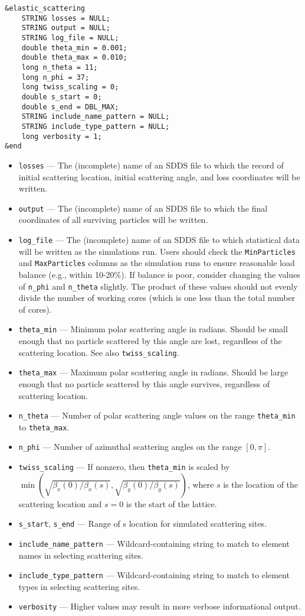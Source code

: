 \documentclass[11pt]{article}
\begin{document}
\begin{verbatim}
&elastic_scattering
    STRING losses = NULL;
    STRING output = NULL;
    STRING log_file = NULL;
    double theta_min = 0.001;
    double theta_max = 0.010;
    long n_theta = 11;
    long n_phi = 37;
    long twiss_scaling = 0;
    double s_start = 0;
    double s_end = DBL_MAX;
    STRING include_name_pattern = NULL;
    STRING include_type_pattern = NULL;
    long verbosity = 1;        
&end
\end{verbatim}

\begin{itemize}
\item \verb|losses| --- The (incomplete) name of an SDDS file to which the record of initial scattering location,
  initial scattering angle, and loss coordinates will be written.
\item \verb|output| --- The (incomplete) name of an SDDS file to which the final coordinates of all surviving particles
  will be written.
\item \verb|log_file| --- The (incomplete) name of an SDDS file to which statistical data will be written as the simulations
  run. Users should check the \verb|MinParticles| and \verb|MaxParticles| columns as the simulation runs to ensure
  reasonable load balance (e.g., within 10-20\%). If balance is poor, consider changing the values of \verb|n_phi| and
  \verb|n_theta| slightly. The product of these values should not evenly divide the number of working cores (which is
  one less than the total number of cores).
\item \verb|theta_min| --- Minimum polar scattering angle in radians. Should be small enough that no particle scattered
  by this angle are lost, regardless of the scattering location. See also \verb|twiss_scaling|.
\item \verb|theta_max| --- Maximum polar scattering angle in radians. Should be large enough that no particle scattered
  by this angle survives, regardless of scattering location. 
\item \verb|n_theta| --- Number of polar scattering angle values on the range \verb|theta_min| to \verb|theta_max|.
\item \verb|n_phi| --- Number of azimuthal scattering angles on the range $[0, \pi]$.
\item \verb|twiss_scaling| --- If nonzero, then \verb|theta_min| is scaled by 
  $\min (\sqrt{\beta_x(0)/\beta_x(s)}, \sqrt{\beta_y(0)/\beta_y(s)})$,
  where $s$ is the location of the scattering location and $s=0$ is the start of the lattice.
\item \verb|s_start|, \verb|s_end| --- Range of s location for simulated scattering sites.
\item \verb|include_name_pattern| --- Wildcard-containing string to match to element names in selecting scattering sites.
\item \verb|include_type_pattern| --- Wildcard-containing string to match to element types in selecting scattering sites.
\item \verb|verbosity| --- Higher values may result in more verbose informational output.
\end{itemize}
\end{document}
